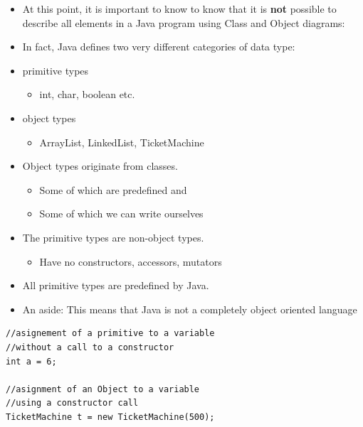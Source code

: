 \documentclass{beamer}
\begin{document}
\begin{frame}
\begin{itemize}
\item At this point, it is important to know to know that it is \textbf{not} possible to describe all elements in a Java program using Class and Object diagrams:
\bigskip 
\item In fact, Java defines two very different categories of data type:
\item primitive types

\begin{itemize}
\item int, char, boolean etc.
\end{itemize}
\item object types

\begin{itemize}
\item ArrayList, LinkedList, TicketMachine
\end{itemize}
\end{itemize}

\end{frame}

\begin{frame}

\begin{itemize}

\item Object types originate from classes.
\begin{itemize}
\item Some of which are predefined and 
\item Some of which we can write ourselves
\end{itemize}
\end{itemize}

\begin{itemize}
\item The primitive types are non-object types.
\begin{itemize}
\item Have no constructors, accessors, mutators
\end{itemize}
\item All primitive types are predefined by Java.
\bigskip
\item An aside: This means that Java is not a completely object oriented language
\end{itemize}

\end{frame}
\begin{frame}[fragile]
\begin{block}{}
\begin{lstlisting}
//asignement of a primitive to a variable 
//without a call to a constructor
int a = 6;

//asignment of an Object to a variable 
//using a constructor call
TicketMachine t = new TicketMachine(500);

\end{lstlisting}
\end{block}
\end{frame}
\end{document}
